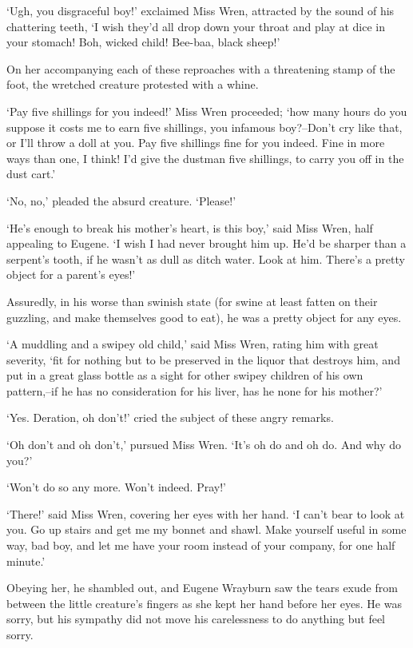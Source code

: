 ‘Ugh, you disgraceful boy!’ exclaimed Miss Wren, attracted by the sound
of his chattering teeth, ‘I wish they’d all drop down your throat and
play at dice in your stomach! Boh, wicked child! Bee-baa, black sheep!’

On her accompanying each of these reproaches with a threatening stamp of
the foot, the wretched creature protested with a whine.

‘Pay five shillings for you indeed!’ Miss Wren proceeded; ‘how many
hours do you suppose it costs me to earn five shillings, you infamous
boy?--Don’t cry like that, or I’ll throw a doll at you. Pay five
shillings fine for you indeed. Fine in more ways than one, I think! I’d
give the dustman five shillings, to carry you off in the dust cart.’

‘No, no,’ pleaded the absurd creature. ‘Please!’

‘He’s enough to break his mother’s heart, is this boy,’ said Miss Wren,
half appealing to Eugene. ‘I wish I had never brought him up. He’d be
sharper than a serpent’s tooth, if he wasn’t as dull as ditch water.
Look at him. There’s a pretty object for a parent’s eyes!’

Assuredly, in his worse than swinish state (for swine at least fatten on
their guzzling, and make themselves good to eat), he was a pretty object
for any eyes.

‘A muddling and a swipey old child,’ said Miss Wren, rating him with
great severity, ‘fit for nothing but to be preserved in the liquor
that destroys him, and put in a great glass bottle as a sight for other
swipey children of his own pattern,--if he has no consideration for his
liver, has he none for his mother?’

‘Yes. Deration, oh don’t!’ cried the subject of these angry remarks.

‘Oh don’t and oh don’t,’ pursued Miss Wren. ‘It’s oh do and oh do. And
why do you?’

‘Won’t do so any more. Won’t indeed. Pray!’

‘There!’ said Miss Wren, covering her eyes with her hand. ‘I can’t
bear to look at you. Go up stairs and get me my bonnet and shawl. Make
yourself useful in some way, bad boy, and let me have your room instead
of your company, for one half minute.’

Obeying her, he shambled out, and Eugene Wrayburn saw the tears exude
from between the little creature’s fingers as she kept her hand before
her eyes. He was sorry, but his sympathy did not move his carelessness
to do anything but feel sorry.

